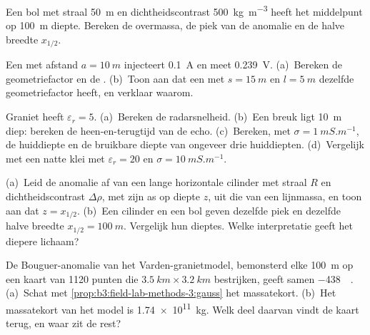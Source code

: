 \begin{exercise}[$\star$]\label{exo:b3:field-lab-methods-3:2}
Een bol met straal \qty{50}{m} en dichtheidscontrast
\qty{+500}{kg.m^{-3}} heeft het middelpunt op \qty{100}{m} diepte. Bereken
de overmassa, de piek van de anomalie en de halve breedte $x_{1/2}$.
\end{exercise}

\begin{exercise}[$\star$]\label{exo:b3:field-lab-methods-3:3}
Een  met afstand $a = \qty{10}{m}$ injecteert \qty{0.1}{A} en
meet \qty{0.239}{V}. (a)~Bereken de geometriefactor en de
. (b)~Toon aan dat een  met $s =
\qty{15}{m}$ en $l = \qty{5}{m}$ dezelfde geometriefactor heeft, en
verklaar waarom.
\end{exercise}

\begin{exercise}[$\star$]\label{exo:b3:field-lab-methods-3:4}
Graniet heeft $\varepsilon_r = 5$. (a)~Bereken de radarsnelheid. (b)~Een
breuk ligt \qty{10}{m} diep: bereken de heen-en-terugtijd van de echo.
(c)~Bereken, met $\sigma = \qty{1}{mS.m^{-1}}$, de huiddiepte en de
bruikbare diepte van ongeveer drie huiddiepten. (d)~Vergelijk met een natte klei met
$\varepsilon_r = 20$ en $\sigma = \qty{10}{mS.m^{-1}}$.
\end{exercise}

\begin{exercise}[$\star\star$]\label{exo:b3:field-lab-methods-3:5}
(a)~Leid de anomalie af van een lange horizontale cilinder met straal $R$ en
dichtheidscontrast $\Delta\rho$, met zijn as op diepte $z$, uit die van een
lijnmassa, en toon aan dat $z = x_{1/2}$. (b)~Een cilinder en een bol
geven dezelfde piek en dezelfde halve breedte $x_{1/2} = \qty{100}{m}$.
Vergelijk hun dieptes. Welke interpretatie geeft het diepere lichaam?
\end{exercise}

\begin{exercise}[$\star\star$]\label{exo:b3:field-lab-methods-3:6}
De Bouguer-anomalie van het Varden-granietmodel, bemonsterd elke
\qty{100}{m} op een kaart van \num{1120} punten die $\qty{3.5}{km}
\times \qty{3.2}{km}$ bestrijken, geeft samen \qty{-438}{\milli\gal}. (a)~Schat met
\cref{prop:b3:field-lab-methods-3:gauss} het massatekort.
(b)~Het massatekort van het model is \qty{1.74e11}{kg}. Welk deel
daarvan vindt de kaart terug, en waar zit de rest?
\end{exercise}

